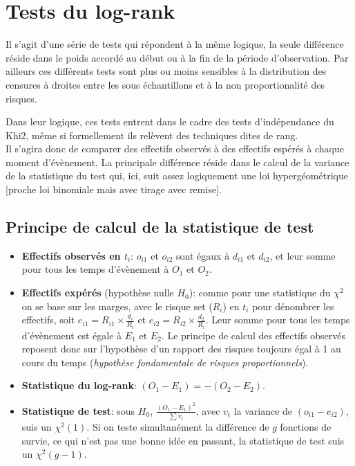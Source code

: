 \documentclass[
  12pt,
  letterpaper,
  DIV=11,
  numbers=noendperiod,
  onepage,
  openany]{scrreprt}
\providecommand{\tightlist}{%
  \setlength{\itemsep}{0pt}\setlength{\parskip}{0pt}}\usepackage{longtable,booktabs,array}
\begin{document}
\hypertarget{tests-du-log-rank}{%
\section{Tests du log-rank}\label{tests-du-log-rank}}

Il s'agit d'une série de tests qui répondent à la même logique, la seule
différence réside dans le poids accordé au début ou à la fin de la
période d'observation. Par ailleurs ces différents tests sont plus ou
moins sensibles à la distribution des censures à droites entre les sous
échantillons et à la non proportionalité des risques.

Dans leur logique, ces tests entrent dans le cadre des tests
d'indépendance du Khi2, même si formellement ils relèvent des techniques
dites de rang.\\
Il s'agira donc de comparer des effectifs observés à des effectifs
espérés à chaque moment d'évènement. La principale différence réside
dans le calcul de la variance de la statistique du test qui, ici, suit
assez logiquement une loi hypergéométrique {[}proche loi binomiale mais
avec tirage avec remise{]}.

\hypertarget{principe-de-calcul-de-la-statistique-de-test}{%
\subsection{Principe de calcul de la statistique de
test}\label{principe-de-calcul-de-la-statistique-de-test}}

\begin{itemize}
\tightlist
\item
  \textbf{Effectifs observés en \(t_i\)}: \(o_{i1}\) et \(o_{i2}\) sont
  égaux à \(d_{i1}\) et \(d_{i2}\), et leur somme pour tous les temps
  d'évènement à \(O_1\) et \(O_2\).
\item
  \textbf{Effectifs expérés} (hypothèse nulle \(H_0\)): comme pour une
  statistique du \(\chi^2\) on se base sur les marges, avec le risque
  set (\(R_i\)) en \(t_i\) pour dénombrer les effectifs, soit
  \(e_{i1}=R_{i1}\times\frac{d_i}{R_i}\) et
  \(e_{i2}=R_{i2}\times\frac{d_2}{R_i}\). Leur somme pour tous les temps
  d'évènement est égale à \(E_1\) et \(E_2\). Le principe de calcul des
  effectifs observés reposent donc sur l'hypothèse d'un rapport des
  risques toujours égal à 1 au cours du temps (\emph{hypothèse
  fondamentale de risques proportionnels}).
\item
  \textbf{Statistique du log-rank}: \((O_1 - E_1) = -(O_2 - E_2)\).
\item
  \textbf{Statistique de test}: sous \(H_0\),
  \(\frac{(O_1 - E_1)^2}{\sum{v_i}}\), avec \(v_i\) la variance de
  \((o_{i1} - e_{i2})\), suis un \(\chi^2(1)\). Si on teste
  simultanément la différence de \(g\) fonctions de survie, ce qui n'est
  pas une bonne idée en passant, la statistique de test suis un
  \(\chi^2(g-1)\).
\end{itemize}
\end{document}

